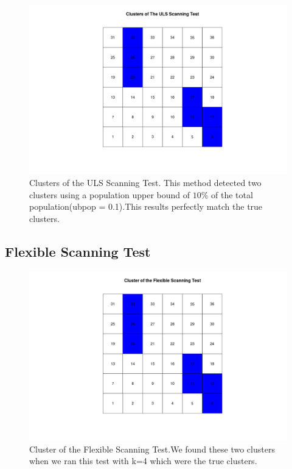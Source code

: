 \documentclass[12pt]{article}
\begin{document}
		\begin{figure}[!ht]
			
			\centering
			\includegraphics[scale=0.2]{Ex1_ULS}
			\caption{Clusters of the ULS Scanning Test. This method detected two clusters using a population upper bound of $10\%$ of the total population(ubpop = 0.1).This results perfectly match the true clusters. \label{f:gull}}
			
		\end{figure}	
	

		 
	 
\subsection{Flexible Scanning Test}	


\begin{figure}[!ht]
	\centering
	\includegraphics[scale=0.2]{Ex1_Flexible}
	\caption{Cluster of the Flexible Scanning Test.We found these two clusters when we ran this test with k=4 which were the true clusters.\label{f:gull}}
\end{figure}
	
\end{document}
